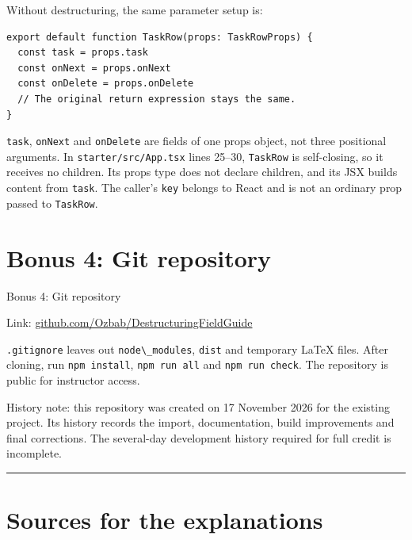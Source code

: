 Without destructuring, the same parameter setup is:

\begin{lstlisting}
export default function TaskRow(props: TaskRowProps) {
  const task = props.task
  const onNext = props.onNext
  const onDelete = props.onDelete
  // The original return expression stays the same.
}
\end{lstlisting}

\passthrough{\lstinline!task!}, \passthrough{\lstinline!onNext!} and \passthrough{\lstinline!onDelete!} are fields of one props object, not three positional arguments.
In \passthrough{\lstinline!starter/src/App.tsx!} lines 25--30, \passthrough{\lstinline!TaskRow!} is self-closing, so it receives no children.
Its props type does not declare children, and its JSX builds content from \passthrough{\lstinline!task!}.
The caller's \passthrough{\lstinline!key!} belongs to React and is not an ordinary prop passed to \passthrough{\lstinline!TaskRow!}.

\section{Bonus 4: Git repository}\label{bonus-4-git-repository}

Bonus 4: Git repository

Link: \href{https://github.com/Ozbab/DestructuringFieldGuide}{github.com/Ozbab/DestructuringFieldGuide}

\passthrough{\lstinline!.gitignore!} leaves out \passthrough{\lstinline!node\_modules!}, \passthrough{\lstinline!dist!} and temporary LaTeX files. After cloning, run
\passthrough{\lstinline!npm install!}, \passthrough{\lstinline!npm run all!} and \passthrough{\lstinline!npm run check!}. The repository is public for instructor access.

History note: this repository was created on 17 November 2026 for the existing project.
Its history records the import, documentation, build improvements and final corrections.
The several-day development history required for full credit is incomplete.

\begin{center}\rule{0.5\linewidth}{0.5pt}\end{center}

\section{Sources for the explanations}\label{sources-for-the-explanations}

